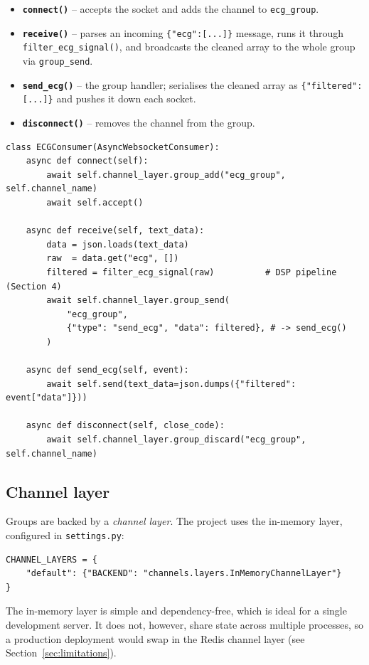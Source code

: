 \begin{itemize}[noitemsep]
  \item \textbf{\texttt{connect()}} -- accepts the socket and adds the channel to
        \texttt{ecg\_group}.
  \item \textbf{\texttt{receive()}} -- parses an incoming \texttt{\{"ecg":[...]\}}
        message, runs it through \texttt{filter\_ecg\_signal()}, and broadcasts the
        cleaned array to the whole group via \texttt{group\_send}.
  \item \textbf{\texttt{send\_ecg()}} -- the group handler; serialises the cleaned
        array as \texttt{\{"filtered":[...]\}} and pushes it down each socket.
  \item \textbf{\texttt{disconnect()}} -- removes the channel from the group.
\end{itemize}

\begin{lstlisting}[style=py,caption={Receiving raw ECG, filtering it, and broadcasting to the group.}]
class ECGConsumer(AsyncWebsocketConsumer):
    async def connect(self):
        await self.channel_layer.group_add("ecg_group", self.channel_name)
        await self.accept()

    async def receive(self, text_data):
        data = json.loads(text_data)
        raw  = data.get("ecg", [])
        filtered = filter_ecg_signal(raw)          # DSP pipeline (Section 4)
        await self.channel_layer.group_send(
            "ecg_group",
            {"type": "send_ecg", "data": filtered}, # -> send_ecg()
        )

    async def send_ecg(self, event):
        await self.send(text_data=json.dumps({"filtered": event["data"]}))

    async def disconnect(self, close_code):
        await self.channel_layer.group_discard("ecg_group", self.channel_name)
\end{lstlisting}

\subsection{Channel layer}
Groups are backed by a \emph{channel layer}. The project uses the in-memory layer,
configured in \texttt{settings.py}:
\begin{lstlisting}[style=py,numbers=none]
CHANNEL_LAYERS = {
    "default": {"BACKEND": "channels.layers.InMemoryChannelLayer"}
}
\end{lstlisting}
The in-memory layer is simple and dependency-free, which is ideal for a single
development server. It does not, however, share state across multiple processes,
so a production deployment would swap in the Redis channel layer
(see Section~\ref{sec:limitations}).

